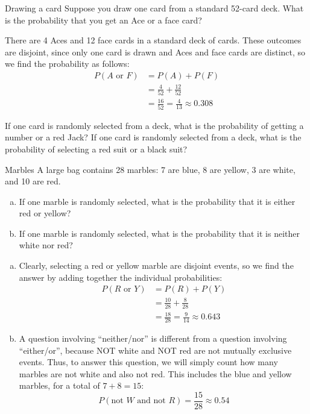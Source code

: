 \begin{example}[https://www.youtube.com/watch?v=uD6AB7t_Das&list=PLfmpjsIzhzts14-9s5QixRje97EI2oeMF&index=11]{Drawing a card}
Suppose you draw one card from a standard 52-card deck. What is the probability that you get an Ace or a face card? 

\sol
There are 4 Aces and 12 face cards in a standard deck of cards. These outcomes are disjoint, since only one card is drawn and Aces and face cards are distinct, so we find the probability as follows:
\begin{align*}
P( A \mbox{ or } F ) &= P(A) + P(F)\\
&= \frac{4}{52} + \frac{12}{52}\\
&= \boxed{\frac{16}{52} = \frac{4}{13} \approx 0.308}
\end{align*}
\end{example}
\vfill

\begin{try}
If one card is randomly selected from a deck, what is the probability of getting a number or a red Jack? If one card is randomly selected from a deck, what is the probability of selecting a red suit or a black suit?
\end{try}
\vfill
\pagebreak

\begin{example}[https://www.youtube.com/watch?v=eS3h94W2Lnk&list=PLfmpjsIzhzts14-9s5QixRje97EI2oeMF&index=12]{Marbles}
A large bag contains 28 marbles: 7 are blue, 8 are yellow, 3 are white, and 10 are  red. 
\begin{enumerate}[(a)]
\item If one marble is randomly selected, what is the probability that it is either red or yellow?
\item If one marble is randomly selected, what is the probability that it is neither white nor red?
\end{enumerate}

\sol
\begin{enumerate}[(a)]
\item Clearly, selecting a red or yellow marble are disjoint events, so we find the answer by adding together the individual probabilities:
\begin{align*}
P( R \mbox{ or } Y ) &= P(R) + P(Y)\\
&= \frac{10}{28} + \frac{8}{28}\\
&= \boxed{\frac{18}{28} = \frac{9}{14} \approx 0.643}
\end{align*}
\item A question involving ``neither/nor'' is different from a question involving ``either/or'', because NOT white and NOT red are not mutually exclusive events.  Thus, to answer this question, we will simply count how many marbles are not white and also not red.  This includes the blue and yellow marbles, for a total of $7 + 8 = 15$:
\[P(\textrm{not } W \textrm{ and not } R) = \boxed{\dfrac{15}{28} \approx 0.54}\]
\end{enumerate}
\end{example}

